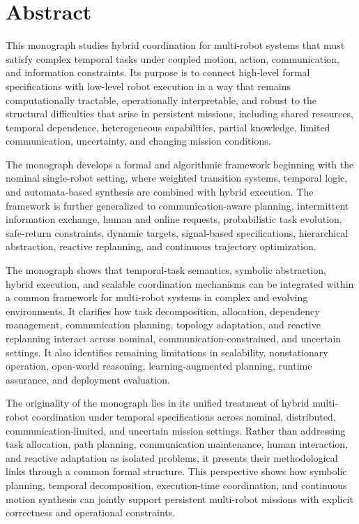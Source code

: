 \chapter*{Abstract}

This monograph studies hybrid coordination for multi-robot systems that must
satisfy complex temporal tasks under coupled motion, action, communication, and
information constraints. Its purpose is to connect high-level formal
specifications with low-level robot execution in a way that remains
computationally tractable, operationally interpretable, and robust to the
structural difficulties that arise in persistent missions, including shared
resources, temporal dependence, heterogeneous capabilities, partial knowledge,
limited communication, uncertainty, and changing mission conditions.

The monograph develops a formal and algorithmic framework beginning with the
nominal single-robot setting, where weighted transition systems, temporal logic,
and automata-based synthesis are combined with hybrid execution.
The framework is further generalized to communication-aware
planning, intermittent information exchange, human and online requests,
probabilistic task evolution, safe-return constraints, dynamic targets,
signal-based specifications, hierarchical abstraction, reactive replanning, and
continuous trajectory optimization.

The monograph shows that temporal-task semantics, symbolic abstraction, hybrid
execution, and scalable coordination mechanisms can be integrated within a
common framework for multi-robot systems in complex and evolving environments.
It clarifies how task decomposition, allocation, dependency management,
communication planning, topology adaptation, and reactive replanning interact
across nominal, communication-constrained, and uncertain settings. It also
identifies remaining limitations in scalability, nonstationary operation,
open-world reasoning, learning-augmented planning, runtime assurance, and
deployment evaluation.

The originality of the monograph lies in its unified treatment of hybrid
multi-robot coordination under temporal specifications across nominal,
distributed, communication-limited, and uncertain mission settings. Rather than
addressing task allocation, path planning, communication maintenance, human
interaction, and reactive adaptation as isolated problems, it presents their
methodological links through a common formal structure. This perspective shows
how symbolic planning, temporal decomposition, execution-time coordination, and
continuous motion synthesis can jointly support persistent multi-robot missions
with explicit correctness and operational constraints.
